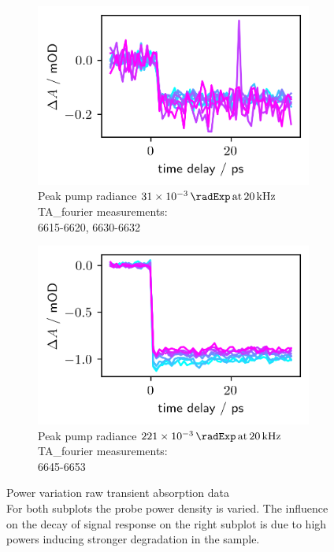 \documentclass[twoside,openright]{scrreprt}
\def\pumpExp#1{\ensuremath{\SI{#1}{\radExp}\,\mathrm{at}\, \SI{20}{\kilo\hertz}}}
\begin{document}
{\begin{figure}[hbtp]
\centering
\begin{subfigure}[t]{0.45\textwidth}
\centering
\includegraphics[scale=1]{images/PowerVarLowPumpVarProbe.png} 
\caption{Peak pump radiance \pumpExp{31e-3}\\TA\_fourier measurements:\\ 6615-6620, 6630-6632\label{fig:PowerVarL}}
\end{subfigure}
\hfill
\begin{subfigure}[t]{0.45\textwidth}
\centering
\includegraphics[scale=1]{images/PowerVarHighPumpVariedProbe.png} 
\caption{Peak pump radiance \pumpExp{221e-3}\\TA\_fourier measurements:\\ 6645-6653\label{fig:PowerVarR}}
\end{subfigure}
\caption{Power variation raw transient absorption data\\
For both subplots the probe power density is varied. The influence on the decay of signal response on the right subplot is due to high powers inducing stronger degradation in the sample.}
\end{figure}

}
\end{document}
